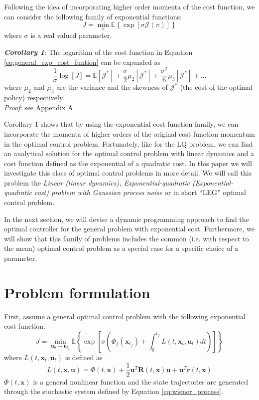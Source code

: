 \documentclass[letterpaper, 10 pt, conference]{ieeeconf}
\newcommand{\vr}{\mathbf r}
\newcommand{\vu}{\mathbf u}
\newcommand{\vx}{\mathbf x}
\newcommand{\vR}{\mathbf R}
\begin{document}
Following the idea of incorporating higher order momenta of the cost
function, we can consider the following family of exponential
functions:
\begin{equation} \label{eq:general_exp_cost_funtion}
J = \min_{\pi} \mathbb{E} \left\{ \exp \left[ \sigma \mathcal{J(\pi)} \right] \right\}
\end{equation} 
where $\sigma$ is a real valued parameter. 

\textbf{\textit{Corollary 1}}: The logarithm of the cost function in Equation \eqref{eq:general_exp_cost_funtion} can be expanded as
\begin{equation}
\frac{1}{\sigma} \log [J] = \mathbb{E}[\mathcal{J}^*] + \frac{\sigma}{2} \mathbb{\mu}_2[\mathcal{J}^*] + \frac{\sigma^2}{6} \mathbb{\mu}_3[\mathcal{J}^*] + ...
\end{equation}
where $\mathbb{\mu}_2$ and $\mathbb{\mu}_3$ are the variance and the skewness of $\mathcal{J^*}$ (the cost of the optimal policy) respectively. \\
\textit{Proof}: see Appendix A.

Corollary 1 shows that by using the exponential cost function family, we can
incorporate the momenta of higher orders of the original cost function
momentum in the optimal control problem. Fortunately, like for the LQ problem, we can find an
analytical solution for the optimal control problem with linear dynamics and a
cost function defined as the exponential of a quadratic cost. In this paper we
will investigate this class of optimal control problems in more detail. We will
call this problem the \emph{Linear (linear dynamics), Exponential-quadratic
(Exponential-quadratic cost) problem with Gaussian process noise} or in short
``LEG'' optimal control problem.

In the next section, we will devise a dynamic programming approach to find the
optimal controller for the general problem with exponential cost. Furthermore, we
will show that this family of problems includes the common (i.e. with respect to
the mean) optimal control problem as a special case for a specific choice of a
parameter.

\section{Problem formulation}
First, assume a general optimal control problem with the following exponential
cost function:
\begin{equation} \label{eq:cost_funtion}
J = \min\limits_{ \vu_0 \to \vu_{t_f}} \mathbb{E}\left\{ \exp\left[ \sigma \left(\Phi_f(\vx_{t_f})+ \int_0^{t_f} { L(t,\vx_t,\vu_t)dt}\right) \right] \right\}
\end{equation}
where $L(t,\vx_t,\vu_t)$ is defined as
\begin{equation} \label{eq:cost_funtion_L}
L(t,\vx,\vu) = \Phi(t,\vx) + \frac{1}{2} \vu^T \vR(t,\vx) \vu + \vu^T \vr(t,\vx)
\end{equation}
$\Phi(t,\vx)$ is a general nonlinear function and the state trajectories are
generated through the stochastic system defined by Equation \eqref{eq:wiener_process}.
\end{document}
